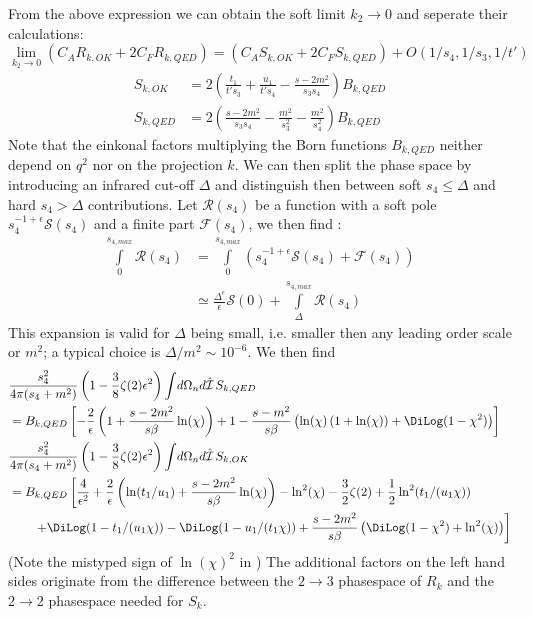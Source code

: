 From the above expression we can obtain the soft limit $k_2\rightarrow 0$ and seperate their calculations:
\begin{equation}
\lim_{k_2\rightarrow 0}\left(C_A R_{k,OK} + 2C_F R_{k,QED}\right) = \left(C_A S_{k,OK} + 2C_F S_{k,QED}\right) + O(1/s_4,1/s_3,1/t')
\end{equation}
\begin{align}
S_{k,OK}  &= 2\left(\frac{t_1}{t's_3} + \frac{u_1}{t's_4}-\frac{s-2m^2}{s_3s_4}\right)B_{k,QED}\\
S_{k,QED} &= 2\left(\frac{s-2m^2}{s_3s_4} - \frac{m^2}{s_3^2} - \frac{m^2}{s_4^2}\right)B_{k,QED}
\end{align}
Note that the einkonal factors multiplying the Born functions $B_{k,QED}$ neither depend on $q^2$ nor on the projection $k$. We can then split the phase space by introducing an infrared cut-off $\Delta$ and distinguish then between soft $s_4\leq \Delta$ and hard $s_4>\Delta$ contributions. Let $\mathcal R(s_4)$ be a function with a soft pole $s_4^{-1+\epsilon}\mathcal S(s_4)$ and a finite part $\mathcal F(s_4)$, we then find \cite{Bojak:2000eu}:
\begin{align}
\int\limits_0^{s_{4,max}} \!\!\mathcal R(s_4) &= \int\limits_0^{s_{4,max}} \!\!\left(s_4^{-1+\epsilon}\mathcal S(s_4) + \mathcal F(s_4)\right)\\
 &\simeq \frac{\Delta^\epsilon}{\epsilon}\mathcal S(0) + \int\limits_\Delta^{s_{4,max}}\!\!\mathcal R(s_4)
\end{align}
This expansion is valid for $\Delta$ being small, i.e. smaller then any leading order scale or $m^2$; a typical choice is $\Delta/m^2 \sim 10^{-6}$. We then find
\begin{align}
&\frac{s_4^2}{4\pi(s_4+m^2)}\left(1-\frac 3 8 \zeta(2)\epsilon^2\right)\int\!d\Omega_n d\hat{\mathcal I}\,S_{k,QED}\nonumber\\
 &= B_{k,QED}\left[-\frac 2 \epsilon\left(1+\frac{s-2m^2}{s\beta}\ln(\chi)\right)
+1 - \frac{s-m^2}{s\beta}\left(\ln(\chi)\left(1+\ln(\chi)\right) + \DiLog(1-\chi^2)\right)
\right] \\
&\frac{s_4^2}{4\pi(s_4+m^2)}\left(1-\frac 3 8 \zeta(2)\epsilon^2\right)\int\!d\Omega_n d\hat{\mathcal I}\,S_{k,OK} \nonumber\\
 &=B_{k,QED}\left[\frac 4 {\epsilon^2} + \frac 2 \epsilon\left(\ln(t_1/u_1)+\frac{s-2m^2}{s\beta}\ln(\chi)\right)-\ln^2(\chi) - \frac 3 2 \zeta(2)+\frac 1 2\ln^2(t_1/(u_1\chi))\right.\nonumber\\
 &\hspace{20pt}\left. +\DiLog(1-t_1/(u_1\chi)) - \DiLog(1-u_1/(t_1\chi)) + \frac{s-2m^2}{s\beta}\left(
\DiLog(1-\chi^2)+\ln^2(\chi)
\right) \right]
\end{align}
(Note the mistyped sign of $\ln(\chi)^2$ in \cite[eq. (3.25)]{Laenen1993162}) The additional factors on the left hand sides originate from the difference between the $2\rightarrow 3$ phasespace of $R_{k}$ and the $2\rightarrow 2$ phasespace needed for $S_k$.

